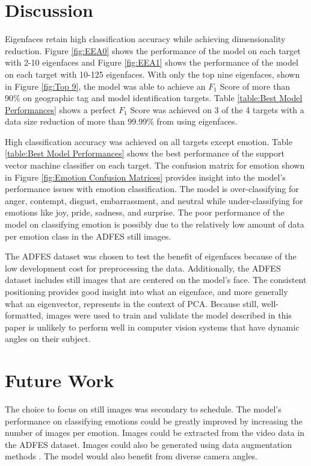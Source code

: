 \documentclass[journal]{new-aiaa}
\begin{document}
\section{Discussion}\label{sec:Discussion}
Eigenfaces retain high classification accuracy while achieving dimensionality reduction.
Figure \ref{fig:EEA0} shows the performance of the model on each target with 2-10 eigenfaces and Figure \ref{fig:EEA1} shows the performance of the model on each target with 10-125 eigenfaces.
With only the top nine eigenfaces, shown in Figure \ref{fig:Top 9}, the model was able to achieve an $F_1$ Score of more than 90\% on geographic tag and model identification targets.
Table \ref{table:Best Model Performances} shows a perfect $F_1$ Score was achieved on 3 of the 4 targets with a data size reduction of more than 99.99\% from using eigenfaces.

High classification accuracy was achieved on all targets except emotion. 
Table \ref{table:Best Model Performances} shows the best performance of the support vector machine classifier on each target.
The confusion matrix for emotion shown in Figure \ref{fig:Emotion Confusion Matrices} provides insight into the model's performance issues with emotion classification.
The model is over-classifying for anger, contempt, disgust, embarrassment, and neutral while under-classifying for emotions like joy, pride, sadness, and surprise.
The poor performance of the model on classifying emotion is possibly due to the relatively low amount of data per emotion class in the ADFES still images.

The ADFES dataset was chosen to test the benefit of eigenfaces because of the low development cost for preprocessing the data.
Additionally, the ADFES dataset includes still images that are centered on the model's face.
The consistent positioning provides good insight into what an eigenface, and more generally what an eigenvector, represents in the context of PCA.
Because still, well-formatted, images were used to train and validate the model described in this paper is unlikely to perform well in computer vision systems that have dynamic angles on their subject.

\section{Future Work}\label{sec:Future Work}
The choice to focus on still images was secondary to schedule.
The model's performance on classifying emotions could be greatly improved by increasing the number of images per emotion.
Images could be extracted from the video data in the ADFES dataset.
Images could also be generated using data augmentation methods \cite{maharana2022review}.
The model would also benefit from diverse camera angles.
\end{document}
